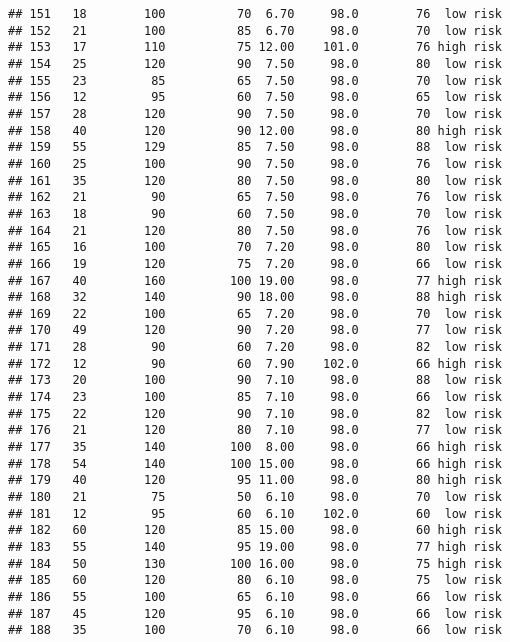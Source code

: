 \documentclass[
  ignorenonframetext,
]{beamer}
\begin{document}
\begin{frame}[fragile]
\begin{verbatim}
## 151   18        100          70  6.70     98.0        76  low risk
## 152   21        100          85  6.70     98.0        70  low risk
## 153   17        110          75 12.00    101.0        76 high risk
## 154   25        120          90  7.50     98.0        80  low risk
## 155   23         85          65  7.50     98.0        70  low risk
## 156   12         95          60  7.50     98.0        65  low risk
## 157   28        120          90  7.50     98.0        70  low risk
## 158   40        120          90 12.00     98.0        80 high risk
## 159   55        129          85  7.50     98.0        88  low risk
## 160   25        100          90  7.50     98.0        76  low risk
## 161   35        120          80  7.50     98.0        80  low risk
## 162   21         90          65  7.50     98.0        76  low risk
## 163   18         90          60  7.50     98.0        70  low risk
## 164   21        120          80  7.50     98.0        76  low risk
## 165   16        100          70  7.20     98.0        80  low risk
## 166   19        120          75  7.20     98.0        66  low risk
## 167   40        160         100 19.00     98.0        77 high risk
## 168   32        140          90 18.00     98.0        88 high risk
## 169   22        100          65  7.20     98.0        70  low risk
## 170   49        120          90  7.20     98.0        77  low risk
## 171   28         90          60  7.20     98.0        82  low risk
## 172   12         90          60  7.90    102.0        66 high risk
## 173   20        100          90  7.10     98.0        88  low risk
## 174   23        100          85  7.10     98.0        66  low risk
## 175   22        120          90  7.10     98.0        82  low risk
## 176   21        120          80  7.10     98.0        77  low risk
## 177   35        140         100  8.00     98.0        66 high risk
## 178   54        140         100 15.00     98.0        66 high risk
## 179   40        120          95 11.00     98.0        80 high risk
## 180   21         75          50  6.10     98.0        70  low risk
## 181   12         95          60  6.10    102.0        60  low risk
## 182   60        120          85 15.00     98.0        60 high risk
## 183   55        140          95 19.00     98.0        77 high risk
## 184   50        130         100 16.00     98.0        75 high risk
## 185   60        120          80  6.10     98.0        75  low risk
## 186   55        100          65  6.10     98.0        66  low risk
## 187   45        120          95  6.10     98.0        66  low risk
## 188   35        100          70  6.10     98.0        66  low risk

\end{verbatim}
\end{frame}
\end{document}
